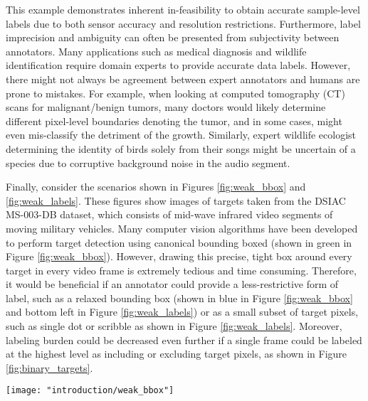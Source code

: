 This example demonstrates inherent in-feasibility to obtain accurate sample-level labels due to both sensor accuracy and resolution restrictions.  Furthermore, label imprecision and ambiguity can often be presented from subjectivity between annotators. Many applications such as medical diagnosis and wildlife identification require domain experts to provide accurate data labels.  However, there might not always be agreement between expert annotators and humans are prone to mistakes.  For example, when looking at computed tomography (CT) scans for malignant/benign tumors, many doctors would likely determine different pixel-level boundaries denoting the tumor, and in some cases, might even mis-classify the detriment of the growth.  Similarly, expert wildlife  ecologist determining the identity of birds solely from their songs might be uncertain of a species due to corruptive background noise in the audio segment.

Finally, consider the scenarios shown in Figures \ref{fig:weak_bbox} and \ref{fig:weak_labels}.  These figures show images of targets taken from the DSIAC MS-003-DB dataset, which consists of mid-wave infrared video segments of moving military vehicles.  Many computer vision algorithms have been developed to perform target detection using canonical bounding boxed (shown in green in Figure \ref{fig:weak_bbox}).  However, drawing this precise, tight box around every target in every video frame is extremely tedious and time consuming.  Therefore, it would be beneficial if an annotator could provide a less-restrictive form of label, such as a relaxed bounding box (shown in blue in Figure \ref{fig:weak_bbox} and bottom left in Figure \ref{fig:weak_labels}) or as a  small subset of target pixels, such as single dot or scribble as shown in Figure \ref{fig:weak_labels}.  Moreover, labeling burden could be decreased even further if a single frame could be labeled at the highest level as including or excluding target pixels, as shown in Figure \ref{fig:binary_targets}. 


\begin{center}
	\begin{figure*}[h]
		\centering
		\texttt{[image: "introduction/weak\_bbox"]}
		\caption{A sample frame from the DSIAC  MS-003-DB MWIR dataset.  Two targets are shown with canonical bounding boxes (green) and relaxed bounding boxes (blue).  Red dots represent the centers of the target objects.}
		\label{fig:weak_bbox}
	\end{figure*}
\end{center}


